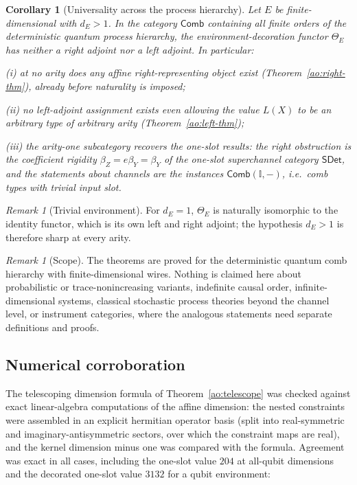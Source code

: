 \documentclass[11pt,a4paper]{article}
\theoremstyle{definition}
\theoremstyle{plain}
\newtheorem{corollary}[theorem]{Corollary}
\theoremstyle{remark}
\newtheorem{remark}[theorem]{Remark}
\newcommand{\Comb}{\mathsf{Comb}}
\newcommand{\SDet}{\mathsf{SDet}}
\begin{document}
\begin{corollary}[Universality across the process hierarchy]
\label{ao:universal-cor}
Let $E$ be finite-dimensional with $d_E>1$. In the category $\Comb$
containing all finite orders of the deterministic quantum process
hierarchy, the environment-decoration functor $\Theta_E$ has neither a
right adjoint nor a left adjoint. In particular:

\emph{(i)} at no arity does any affine right-representing object exist
(Theorem~\ref{ao:right-thm}), already before naturality is imposed;

\emph{(ii)} no left-adjoint assignment exists even allowing the value
$L(X)$ to be an arbitrary type of arbitrary arity
(Theorem~\ref{ao:left-thm});

\emph{(iii)} the arity-one subcategory recovers the one-slot results: the
right obstruction is the coefficient rigidity
$\beta_Z=e\beta_Y=\beta_Y$ of the one-slot superchannel category $\SDet$, and the
statements about channels are the instances $\Comb(\mathbb
I,-)$, i.e.\ comb types with trivial input slot.
\end{corollary}

\begin{remark}[Trivial environment]
For $d_E=1$, $\Theta_E$ is naturally isomorphic to the identity functor,
which is its own left and right adjoint; the hypothesis $d_E>1$ is
therefore sharp at every arity.
\end{remark}

\begin{remark}[Scope]
The theorems are proved for the deterministic quantum comb hierarchy with
finite-dimensional wires. Nothing is claimed here about probabilistic or
trace-nonincreasing variants, indefinite causal order, infinite-dimensional
systems, classical stochastic process theories beyond the channel level, or
instrument categories, where the analogous statements need separate
definitions and proofs.
\end{remark}

\subsection{Numerical corroboration}
\label{ao:numerics}

The telescoping dimension formula of Theorem~\ref{ao:telescope} was
checked against exact linear-algebra computations of the affine dimension:
the nested constraints were assembled in an explicit hermitian operator
basis (split into real-symmetric and imaginary-antisymmetric sectors, over
which the constraint maps are real), and the kernel dimension minus one was
compared with the formula. Agreement was exact in all cases, including the
one-slot value $204$ at all-qubit dimensions and the decorated one-slot
value $3132$ for a qubit environment:
\end{document}
